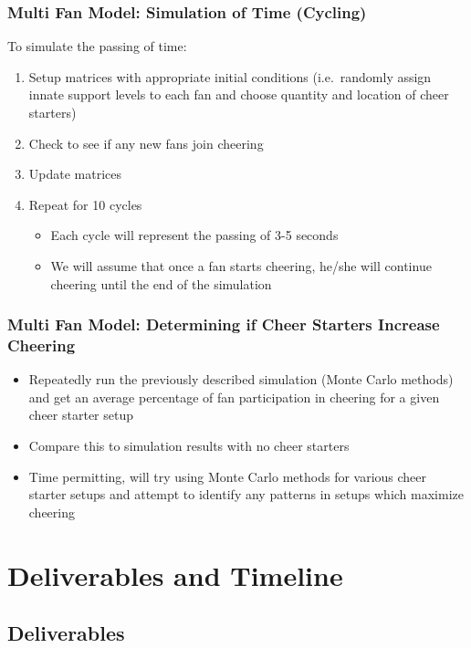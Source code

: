 \documentclass[compress,handout,10pt]{beamer}
\let\olditem\item
\renewcommand{\item}{\setlength{\itemsep}{0.5\baselineskip}\olditem}
\begin{document}
\begin{frame}
\frametitle{Multi Fan Model: Simulation of Time (Cycling)}
To simulate the passing of time:
	\begin {enumerate}
		\item Setup matrices with appropriate initial conditions (i.e.~randomly assign innate support levels to each fan and choose quantity and location of cheer starters)
		\item Check to see if any new fans join cheering
		\item Update matrices
		\item Repeat for 10 cycles
	\begin {itemize}
		\item Each cycle will represent the passing of 3-5 seconds
		\item We will assume that once a fan starts cheering, he/she will continue cheering until the end of the simulation
	\end{itemize}
	\end {enumerate}
\end{frame}

\begin{frame}
\frametitle{Multi Fan Model: Determining if Cheer Starters Increase Cheering}
\begin{itemize}
	\item Repeatedly run the previously described simulation (Monte Carlo methods) and get an average percentage of fan participation in cheering for a given cheer starter setup
	\item Compare this to simulation results with no cheer starters
	\item Time permitting, will try using Monte Carlo methods for various cheer starter setups and attempt to identify any patterns in setups which maximize cheering 
\end{itemize}
\end{frame}

\section {Deliverables and Timeline}

\subsection{Deliverables}
\end{document}
